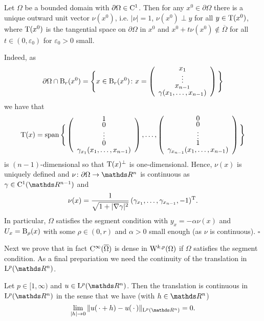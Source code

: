 \begin{rem}
  Let $\Omega$ be a bounded domain with $\partial \Omega \in \mathrm{C}^1$.
  Then for any $x^0\in \partial\Omega$ there is a unique outward unit vector $\nu(x^0)$, i.e. $|\nu| = 1$, $\nu(x^0) \perp y$ for all $y \in \mathrm{T}(x^0)$, where $\mathrm{T}(x^0)$ is the tangential space on $\partial\Omega$ in $x^0$ and $x^0 + t\nu(x^0) \notin\overline\Omega$ for all $t \in (0,\varepsilon_0)$ for $\varepsilon_0 > 0$ small.

  Indeed, as 
  $$
  \def\arraystretch{0.6}
  \partial\Omega \cap \BB_r(x^0) = \Bigg\{ x \in \BB_r(x^0) \colon x = \left( \begin{array}{c} x_1 \\ \vdots \\ x_{n - 1} \\ \gamma(x_1,\dots,x_{n-1}) \end{array} \right) \Bigg\} 
  $$
  we have that
  $$
  \def\arraystretch{0.6}
  \TT(x) = \Span \Bigg\{ 
    \left(\begin{array}{c} 1 \\ 0 \\ \vdots \\ 0 \\ \gamma_{x_1}(x_1,\dots,x_{n - 1}) \end{array} \right),
    \dots, 
    \left(\begin{array}{c} 0 \\ 0 \\ \vdots \\ 1 \\ \gamma_{x_{n-1}}(x_1,\dots,x_{n - 1}) \end{array} \right)\Bigg\}
  $$
  is $(n-1)$-dimensional so that $\mathrm{T}(x)^\perp$ is one-dimensional.
  Hence, $\nu(x)$ is uniquely defined and $\nu \colon \partial\Omega \to \R^n$ is continuous as $\gamma \in \CC^1(\R^{n - 1})$ and 
  $$
  \nu(x) = \frac{1}{\sqrt{1 + |\nabla \gamma|^2}} \, (\gamma_{x_1},\dots,\gamma_{x_{n - 1}}, -1)^{\mathrm{T}}.
  $$
  In particular, $\Omega$ satisfies the segment condition with $y_x = -\alpha \nu(x)$ and $U_x = \mathrm{B}_\rho(x)$ with some $\rho \in (0,r)$ and $\alpha > 0$ small enough (as $\nu$ is continuous). \hfill$\square$
\end{rem}

Next we prove that in fact $\mathrm{C}^\infty(\overline \Omega)$ is dense in $\mathrm{W}^{k,p}(\Omega)$ if $\Omega$ satisfies the segment condition. 
As a final prepariation we need the continuity of the translation in $\Ell^p(\R^n)$.

\begin{prop}\label{prop:continuousTrans}
  Let $p \in [1,\infty)$ and $u \in \Ell^p(\R^n)$. 
    Then the translation is continuous in $\Ell^p(\R^n)$ in the sense that we have (with $h \in \R^n$)
    $$
    \lim_{|h| \to 0} \| u(\,\cdot + h) - u(\,\cdot\,)\|_{\Ell^p(\R^n)} = 0.
    $$
\end{prop}

